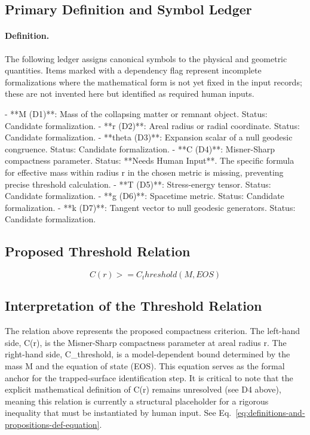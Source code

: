 \documentclass[conference]{IEEEtran}
\begin{document}
\subsection{Primary Definition and Symbol Ledger}
\paragraph{Definition.} The following ledger assigns canonical symbols to the physical and geometric quantities. Items marked with a dependency flag represent incomplete formalizations where the mathematical form is not yet fixed in the input records; these are not invented here but identified as required human inputs.

- **M (D1)**: Mass of the collapsing matter or remnant object. Status: Candidate formalization. - **r (D2)**: Areal radius or radial coordinate. Status: Candidate formalization. - **theta (D3)**: Expansion scalar of a null geodesic congruence. Status: Candidate formalization. - **C (D4)**: Misner-Sharp compactness parameter. Status: **Needs Human Input**. The specific formula for effective mass within radius r in the chosen metric is missing, preventing precise threshold calculation. - **T (D5)**: Stress-energy tensor. Status: Candidate formalization. - **g (D6)**: Spacetime metric. Status: Candidate formalization. - **k (D7)**: Tangent vector to null geodesic generators. Status: Candidate formalization.

\subsection{Proposed Threshold Relation}
\begin{equation}
C(r) >= C_threshold(M, EOS)
\label{eq:definitions-and-propositions-def-equation}
\end{equation}

\subsection{Interpretation of the Threshold Relation}
The relation above represents the proposed compactness criterion. The left-hand side, C(r), is the Misner-Sharp compactness parameter at areal radius r. The right-hand side, C\_threshold, is a model-dependent bound determined by the mass M and the equation of state (EOS). This equation serves as the formal anchor for the trapped-surface identification step. It is critical to note that the explicit mathematical definition of C(r) remains unresolved (see D4 above), meaning this relation is currently a structural placeholder for a rigorous inequality that must be instantiated by human input. See Eq.~\eqref{eq:definitions-and-propositions-def-equation}.
\end{document}

